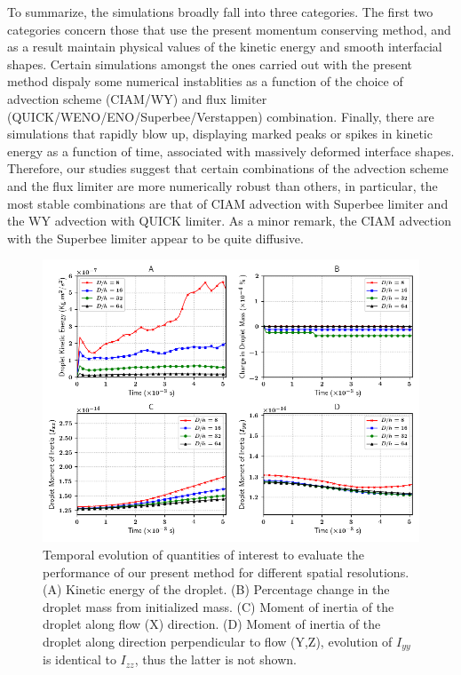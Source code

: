 \vspace*{0.2cm}

To summarize, the simulations broadly fall into three categories. The first two categories concern those that use the present momentum conserving method, and as a result maintain physical values of the kinetic energy and smooth interfacial shapes. Certain simulations amongst the ones carried out with the present method dispaly some numerical instablities as a function of the choice of advection scheme (CIAM/WY) and flux limiter (QUICK/WENO/ENO/Superbee/Verstappen) combination. Finally, there are simulations that rapidly blow up, displaying marked peaks or spikes in kinetic energy as a function of time, associated with massively deformed interface shapes. Therefore, our studies suggest that certain combinations of the advection scheme and the flux limiter are more numerically robust than others, in particular, the most stable combinations are that of CIAM advection with Superbee limiter and the WY advection with QUICK limiter. As a minor remark, the CIAM advection with the Superbee limiter appear to be quite diffusive. 

\vspace*{0.2cm}

\begin{figure}[h!]
\begin{center}
\includegraphics[scale = 0.6]{Figures/Sagar/multiplot_raindrop.png}
\end{center}
\vspace*{-0.5cm}
	\caption{Temporal evolution of quantities of interest to evaluate the performance of our present method for different spatial resolutions. (A) Kinetic energy of the droplet. (B) Percentage change in the droplet mass from initialized mass. (C) Moment of inertia of the droplet along flow (X) direction. (D) Moment of inertia of the droplet along direction perpendicular to flow (Y,Z), evolution of $I_{yy}$ is identical to $I_{zz}$, thus the latter is not shown.}
\label{multi}
\end{figure}

